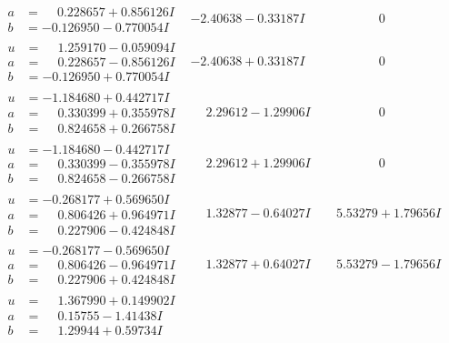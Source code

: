 \documentclass[1p]{elsarticle_modified}
\theoremstyle{definition}
\begin{document}
$$\begin{array}{c|c|c}
\begin{aligned}
a &= \phantom{-}0.228657 + 0.856126 I \\
b &= -0.126950 - 0.770054 I\end{aligned}
 & -2.40638 - 0.33187 I & \phantom{-0.000000 } 0 \\ \hline\begin{aligned}
u &= \phantom{-}1.259170 - 0.059094 I \\
a &= \phantom{-}0.228657 - 0.856126 I \\
b &= -0.126950 + 0.770054 I\end{aligned}
 & -2.40638 + 0.33187 I & \phantom{-0.000000 } 0 \\ \hline\begin{aligned}
u &= -1.184680 + 0.442717 I \\
a &= \phantom{-}0.330399 + 0.355978 I \\
b &= \phantom{-}0.824658 + 0.266758 I\end{aligned}
 & \phantom{-}2.29612 - 1.29906 I & \phantom{-0.000000 } 0 \\ \hline\begin{aligned}
u &= -1.184680 - 0.442717 I \\
a &= \phantom{-}0.330399 - 0.355978 I \\
b &= \phantom{-}0.824658 - 0.266758 I\end{aligned}
 & \phantom{-}2.29612 + 1.29906 I & \phantom{-0.000000 } 0 \\ \hline\begin{aligned}
u &= -0.268177 + 0.569650 I \\
a &= \phantom{-}0.806426 + 0.964971 I \\
b &= \phantom{-}0.227906 - 0.424848 I\end{aligned}
 & \phantom{-}1.32877 - 0.64027 I & \phantom{-}5.53279 + 1.79656 I \\ \hline\begin{aligned}
u &= -0.268177 - 0.569650 I \\
a &= \phantom{-}0.806426 - 0.964971 I \\
b &= \phantom{-}0.227906 + 0.424848 I\end{aligned}
 & \phantom{-}1.32877 + 0.64027 I & \phantom{-}5.53279 - 1.79656 I \\ \hline\begin{aligned}
u &= \phantom{-}1.367990 + 0.149902 I \\
a &= \phantom{-}0.15755 - 1.41438 I \\
b &= \phantom{-}1.29944 + 0.59734 I\end{aligned}

\end{array}$$
\end{document}
